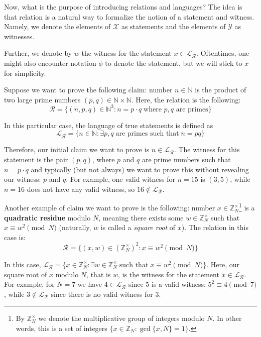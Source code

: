\documentclass[../lecture-notes.tex]{subfiles}
\begin{document}
Now, what is the purpose of introducing relations and languages? The idea is that relation is a natural way to formalize the notion of a statement and witness. Namely, we denote the elements of $\mathcal{X}$ as statements and the elements of $\mathcal{Y}$ as witnesses.

Further, we denote by $w$ the witness for the statement $x \in \mathcal{L}_{\mathcal{R}}$. Oftentimes, one might also encounter notation $\phi$ to denote the statement, but we will stick to $x$ for simplicity.

\begin{example}
    Suppose we want to prove the following claim: number $n \in \mathbb{N}$ is the product of two large prime numbers $(p,q) \in \mathbb{N} \times \mathbb{N}$. Here, the relation is the following:
    \begin{equation*}
        \mathcal{R} = \{ (n, p, q) \in \mathbb{N}^3: n = p \cdot q \; \text{where $p,q$ are primes} \}
    \end{equation*}

    In this particular case, the language of true statements is defined as 
    \begin{equation*}
        \mathcal{L}_{\mathcal{R}} = \{n \in \mathbb{N}: \exists p,q \; \text{are primes such that}\; n = pq\}
    \end{equation*}
    
    Therefore, our initial claim we want to prove is $n \in \mathcal{L}_{\mathcal{R}}$. The witness for this statement is the pair $(p,q)$, where $p$ and $q$ are prime numbers such that $n = p \cdot q$ and typically (but not always) we want to prove this without revealing our witness: $p$ and $q$. For example, one valid witness for $n = 15$ is $(3,5)$, while $n=16$ does not have any valid witness, so $16 \not\in \mathcal{L}_{\mathcal{R}}$.
\end{example}

\begin{example}
    Another example of claim we want to prove is the following: number $x \in \mathbb{Z}_N^{\times}$\footnote{By $\mathbb{Z}_N^{\times}$ we denote the multiplicative group of integers modulo $N$. In other words, this is a set of integers $\{x \in \mathbb{Z}_N: \gcd \{x, N\} = 1\}$.} is a \textbf{quadratic residue} modulo $N$, meaning there exists some $w \in \mathbb{Z}_N^{\times}$ such that $x \equiv w^2 \pmod{N}$ (naturally, $w$ is called a \textit{square root} of $x$). The relation in this case is:
    \begin{equation*}
        \mathcal{R} = \{ (x, w) \in (\mathbb{Z}_N^{\times})^2: x \equiv w^2 \pmod{N} \}
    \end{equation*}

    In this case, $\mathcal{L}_{\mathcal{R}} = \{x \in \mathbb{Z}_N^{\times}: \exists w \in \mathbb{Z}_N^{\times} \; \text{such that} \; x \equiv w^2 \pmod{N}\}$. Here, our square root of $x$ modulo $N$, that is $w$, is the witness for the statement $x \in \mathcal{L}_{\mathcal{R}}$. For example, for $N=7$ we have $4 \in \mathcal{L}_{\mathcal{R}}$ since $5$ is a valid witness: $5^2 \equiv 4 \pmod{7}$, while $3 \not\in \mathcal{L}_{\mathcal{R}}$ since there is no valid witness for $3$.
\end{example}
\end{document}
